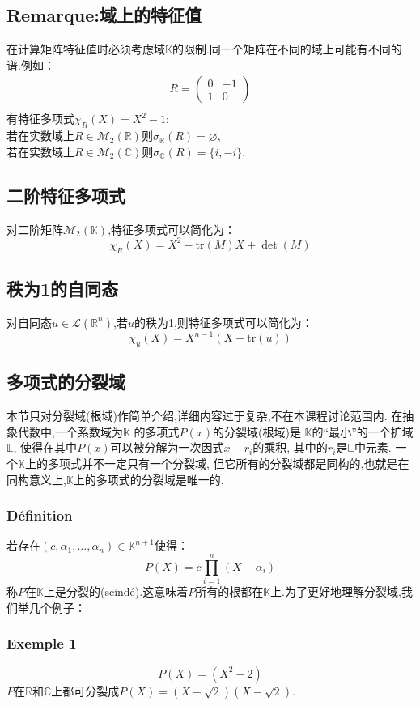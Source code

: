\documentclass[12pt, a4paper, oneside]{ctexbook}
\newcommand{\R }{\mathbb{R}}%
\begin{document}
  \subsection{Remarque:域上的特征值}
  在计算矩阵特征值时必须考虑域$\mathbb{K}$的限制.同一个矩阵在不同的域上可能有不同的谱.例如：
  $$
  \begin{aligned}
    R=\begin{pmatrix} 0 & -1 \\ 1 & 0 \end{pmatrix}\\
  \end{aligned}
  $$
  有特征多项式$\chi _R(X)=X^2-1$:\\
  若在实数域上$R\in \mathcal{M}_2(\R)$则$\sigma_{\R}(R)=\varnothing$,\\
  若在实数域上$R\in \mathcal{M}_2(\mathbb{C})$则$\sigma_{\mathbb{C}}(R)=\{i,-i\}$.
  \subsection{二阶特征多项式}
  对二阶矩阵$\mathcal{M}_2(\mathbb{K})$,特征多项式可以简化为：
  $$
  \chi _R(X)=X^2-\mbox{tr}(M)X+\det(M)
  $$
  \subsection{秩为1的自同态}
  对自同态$u\in\mathcal{L} (\R^n)$,若$u$的秩为1,则特征多项式可以简化为：
  $$
  \chi _u(X)=X^{n-1}(X-\mbox{tr}(u))
  $$
  \subsection{多项式的分裂域}
  本节只对分裂域(根域)作简单介绍,详细内容过于复杂,不在本课程讨论范围内.
  在抽象代数中,一个系数域为$\mathbb {K}$ 的多项式${P(x)}$的分裂域(根域)是
  $\mathbb {K} $的“最小”的一个扩域$\mathbb{L}$,
  使得在其中$P(x)$可以被分解为一次因式$x-r_{i}$的乘积,
  其中的$r_{i}$是$\mathbb{L}$中元素.
  一个$\mathbb {K} $上的多项式并不一定只有一个分裂域,
  但它所有的分裂域都是同构的,也就是在同构意义上,$\mathbb {K} $上的多项式的分裂域是唯一的.
  \subsubsection{Définition}
  若存在$(c,\alpha_1,\dots,\alpha_n)\in\mathbb{K}^{n+1}$使得：
  $$
    P(X)=c\prod_{i=1}^{n} (X-\alpha_i)
  $$
  称$P$在$\mathbb {K} $上是分裂的(scindé).这意味着$P$所有的根都在$\mathbb {K} $上.为了更好地理解分裂域,我们举几个例子：
  \subsubsection{Exemple 1}
  $$
    P(X)=(X^2-2)
  $$
  $P$在$\mathbb {R} $和$\mathbb {C} $上都可分裂成$P(X)=(X+\sqrt{2})(X-\sqrt{2})$.
\end{document}
